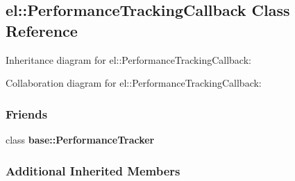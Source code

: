\hypertarget{a00066}{}\subsection{el\+:\+:Performance\+Tracking\+Callback Class Reference}
\label{a00066}


Inheritance diagram for el\+:\+:Performance\+Tracking\+Callback\+:


Collaboration diagram for el\+:\+:Performance\+Tracking\+Callback\+:
\subsubsection*{Friends}
\begin{DoxyCompactItemize}
\item 
\hypertarget{a00066_a05f271f9cc2531409fe682c6ce0d9feb}{}class {\bfseries base\+::\+Performance\+Tracker}\label{a00066_a05f271f9cc2531409fe682c6ce0d9feb}

\end{DoxyCompactItemize}
\subsubsection*{Additional Inherited Members}
